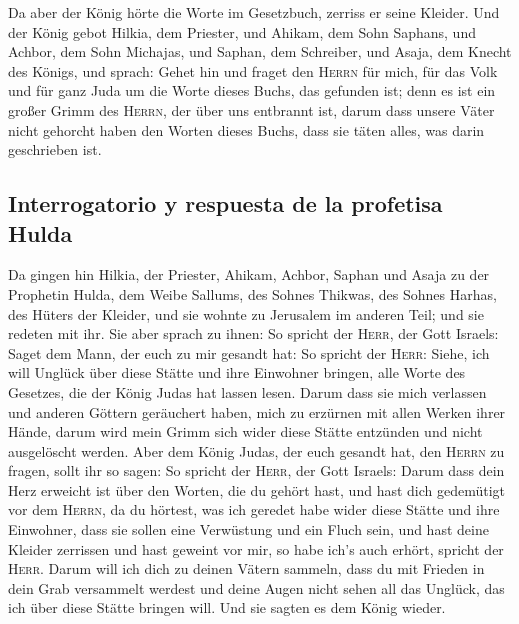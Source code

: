  Da aber der König hörte die Worte im Gesetzbuch, zerriss
er seine Kleider.  Und der König gebot Hilkia, dem
Priester, und Ahikam, dem Sohn Saphans, und Achbor, dem Sohn Michajas,
und Saphan, dem Schreiber, und Asaja, dem Knecht des Königs, und sprach:
 Gehet hin und fraget den \textsc{Herrn} für mich, für
das Volk und für ganz Juda um die Worte dieses Buchs, das gefunden ist;
denn es ist ein großer Grimm des \textsc{Herrn}, der über uns entbrannt
ist, darum dass unsere Väter nicht gehorcht haben den Worten dieses
Buchs, dass sie täten alles, was darin geschrieben ist.

\hypertarget{interrogatorio-y-respuesta-de-la-profetisa-hulda}{%
\subsection{Interrogatorio y respuesta de la profetisa
Hulda}\label{interrogatorio-y-respuesta-de-la-profetisa-hulda}}

 Da gingen hin Hilkia, der Priester, Ahikam, Achbor,
Saphan und Asaja zu der Prophetin Hulda, dem Weibe Sallums, des Sohnes
Thikwas, des Sohnes Harhas, des Hüters der Kleider, und sie wohnte zu
Jerusalem im anderen Teil; und sie redeten mit ihr.  Sie
aber sprach zu ihnen: So spricht der \textsc{Herr}, der Gott Israels:
Saget dem Mann, der euch zu mir gesandt hat:  So spricht
der \textsc{Herr}: Siehe, ich will Unglück über diese Stätte und ihre
Einwohner bringen, alle Worte des Gesetzes, die der König Judas hat
lassen lesen.  Darum dass sie mich verlassen und anderen
Göttern geräuchert haben, mich zu erzürnen mit allen Werken ihrer Hände,
darum wird mein Grimm sich wider diese Stätte entzünden und nicht
ausgelöscht werden.  Aber dem König Judas, der euch
gesandt hat, den \textsc{Herrn} zu fragen, sollt ihr so sagen: So
spricht der \textsc{Herr}, der Gott Israels:  Darum dass
dein Herz erweicht ist über den Worten, die du gehört hast, und hast
dich gedemütigt vor dem \textsc{Herrn}, da du hörtest, was ich geredet
habe wider diese Stätte und ihre Einwohner, dass sie sollen eine
Verwüstung und ein Fluch sein, und hast deine Kleider zerrissen und hast
geweint vor mir, so habe ich's auch erhört, spricht der \textsc{Herr}.
 Darum will ich dich zu deinen Vätern sammeln, dass du
mit Frieden in dein Grab versammelt werdest und deine Augen nicht sehen
all das Unglück, das ich über diese Stätte bringen will. Und sie sagten
es dem König wieder.

